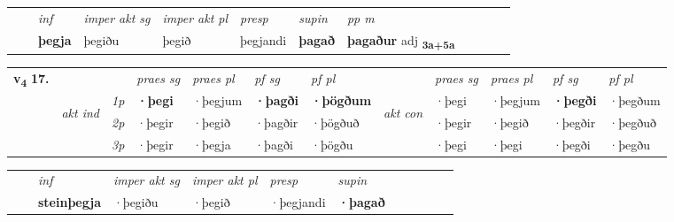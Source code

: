 \begin{tabular}{llllllllllll}
 & & \textit{inf} & \textit{imper akt sg} & \textit{imper akt pl}   & \textit{presp} & \textit{supin}  & \textit{pp m}     \\*
  & & \textbf{þegja} & þegiðu  & þegið   & þegjandi &  \textbf{þagað}  & \textbf{þagaður} adj \textbf{\textsubscript{3a+5a}} \\*
\cmidrule{1-12}
\end{tabular}



\begin{tabular}{llllllllllll} \toprule
\multirow{4}{*}{{{\textbf{v{\textsubscript{4}}} \Large{\textbf{17.}}}}}  & &   &  \textit{praes sg}  & \textit{praes pl}  &\textit{ pf sg} & \textit{pf pl} &  &  \textit{praes sg}  & \textit{praes pl}  & \textit{pf sg} & \textit{pf pl } \\*
	\cmidrule{4-7} \cmidrule{9-12}
 & \multirow{3}{*}{\begin{turn}{90}\textit{akt ind}\end{turn}} & {\textit{1p}} & \textbf{·þegi} & ·þegjum    & \textbf{·þagði} & \textbf{·þögðum} & \multirow{3}{*}{\begin{turn}{90}\textit{akt con}\end{turn}} &·þegi & ·þegjum & \textbf{·þegði} & ·þegðum\\*
& &  {\textit{2p}} &  ·þegir  & ·þegið   & ·þagðir & ·þögðuð & & ·þegir & ·þegið & ·þegðir & ·þegðuð \\*
& &  {\textit{3p}} & ·þegir & ·þegja   & ·þagði & ·þögðu & & ·þegi & ·þegi& ·þegði & ·þegðu  \\*
\cmidrule{4-7} \cmidrule{9-12}
\end{tabular}


\begin{tabular}{llllllllllll}
 & & \textit{inf} & \textit{imper akt sg} & \textit{imper akt pl}   & \textit{presp} & \textit{supin}       \\*
  & & \textbf{steinþegja} & ·þegiðu  & ·þegið   & ·þegjandi &  \textbf{·þagað}   \\*
\cmidrule{1-12}
\end{tabular}



